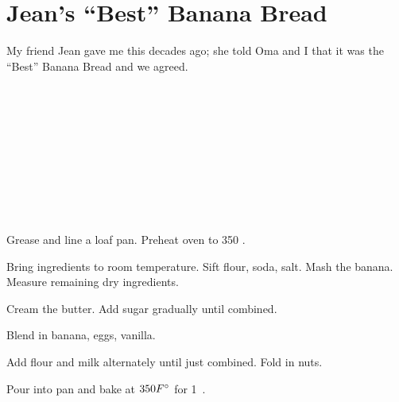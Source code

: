 \section[``Best'' Banana Bread]{
    Jean's ``Best'' Banana Bread
}

\begin{recipestats}[
        servings=1 loaf,
        preptime=30 \minute,
        bakingtime=1 \onehalf~\hour,
        source=Pamela Teresi \& Jean Jesperse,
    ]
\end{recipestats}

\begin{recipeabstract}
    My friend Jean gave me this decades ago;
    she told Oma and I that it was the ``Best'' Banana Bread and we agreed.
\end{recipeabstract}

\begin{ingredientcolumns}
    \begin{ingredientblock}
        \\
        \\
        \\
        \\
    \end{ingredientblock}
    \begin{ingredientblock}
        \\
        \\
        \\
        \\
    \end{ingredientblock}
\end{ingredientcolumns}

\begin{preparation}
\item Grease and line a loaf pan.
    Preheat oven to 350 \Fahrenheit.

\item Bring ingredients to room temperature.
    Sift flour, soda, salt.
    Mash the banana.
    Measure remaining dry ingredients.

\item Cream the butter.
    Add sugar gradually until combined.

\item Blend in banana, eggs, vanilla.

\item Add flour and milk alternately until just combined.
    Fold in nuts.

\item Pour into pan and bake at $350 F^\circ$ for 1\onehalf~\hour.
\end{preparation}

\recipeend%
